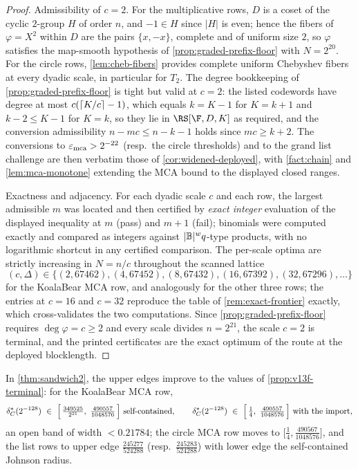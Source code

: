 \begin{proof}
Admissibility of $c=2$.  For the multiplicative rows, $D$ is a coset of the cyclic $2$-group $H$ of order $n$, and $-1\in H$ since $|H|$ is even; hence the fibers of $\varphi=X^2$ within $D$ are the pairs $\{x,-x\}$, complete and of uniform size $2$, so $\varphi$ satisfies the map-smooth hypothesis of \cref{prop:graded-prefix-floor} with $N=2^{20}$.  For the circle rows, \cref{lem:cheb-fibers} provides complete uniform Chebyshev fibers at every dyadic scale, in particular for $T_2$.  The degree bookkeeping of \cref{prop:graded-prefix-floor} is tight but valid at $c=2$: the listed codewords have degree at most $c(\left\lceil K/c\right\rceil-1)$, which equals $k=K-1$ for $K=k+1$ and $k-2\le K-1$ for $K=k$, so they lie in $\RS[\F,D,K]$ as required, and the conversion admissibility $n-mc\le n-k-1$ holds since $mc\ge k+2$.  The conversions to $\varepsilon_{\mathrm{mca}}>2^{-22}$ \textup(resp.\ the circle thresholds\textup) and to the grand list challenge are then verbatim those of \cref{cor:widened-deployed}, with \cref{fact:chain} and \cref{lem:mca-monotone} extending the MCA bound to the displayed closed ranges.

Exactness and adjacency.  For each dyadic scale $c$ and each row, the largest admissible $m$ was located and then certified by \emph{exact integer} evaluation of the displayed inequality at $m$ \textup(pass\textup) and $m+1$ \textup(fail\textup); binomials were computed exactly and compared as integers against $|\mathbb B|^wq$-type products, with no logarithmic shortcut in any certified comparison.  The per-scale optima are strictly increasing in $N=n/c$ throughout the scanned lattice
\[
(c,\Delta)\in\{(2,67462),(4,67452),(8,67432),(16,67392),(32,67296),\ldots\}
\]
for the KoalaBear MCA row, and analogously for the other three rows; the entries at $c=16$ and $c=32$ reproduce the table of \cref{rem:exact-frontier} exactly, which cross-validates the two computations.  Since \cref{prop:graded-prefix-floor} requires $\deg\varphi=c\ge2$ and every scale divides $n=2^{21}$, the scale $c=2$ is terminal, and the printed certificates are the exact optimum of the route at the deployed blocklength.
\end{proof}

\begin{corollary}\label{cor:v13f-sandwich}
In \cref{thm:sandwich2}, the upper edges improve to the values of \cref{prop:v13f-terminal}: for the KoalaBear MCA row,
\[
\delta^*_C(2^{-128})\ \in\ \Bigl[\,\tfrac{349525}{2^{21}},\ \tfrac{490557}{1048576}\,\Bigr]
\ \text{self-contained},
\qquad
\delta^*_C(2^{-128})\ \in\ \Bigl[\,\tfrac14,\ \tfrac{490557}{1048576}\,\Bigr]
\ \text{with the import},
\]
an open band of width $<0.21784$; the circle MCA row moves to $\bigl[\tfrac14,\tfrac{490567}{1048576}\bigr]$, and the list rows to upper edge $\tfrac{245277}{524288}$ \textup(resp.\ $\tfrac{245283}{524288}$\textup) with lower edge the self-contained Johnson radius.
\end{corollary}

